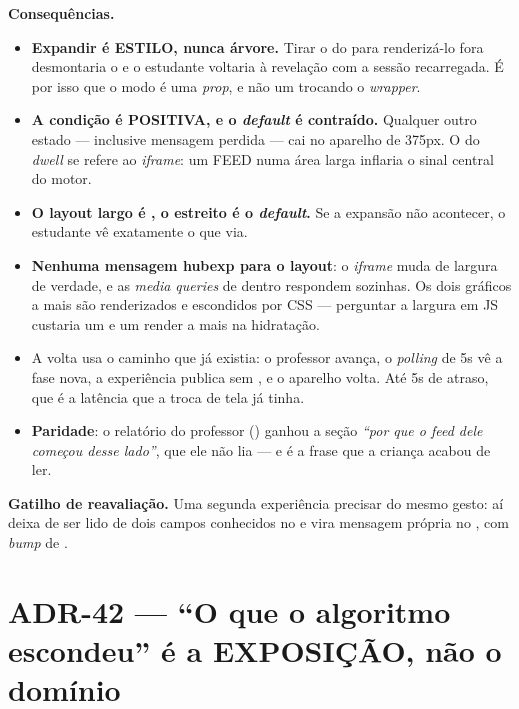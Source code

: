\textbf{Consequências.}
\begin{itemize}
  \item \textbf{Expandir é ESTILO, nunca árvore.} Tirar o  do
     para renderizá-lo fora desmontaria o  e
    o estudante voltaria à revelação com a sessão recarregada. É por isso que o
    modo é uma \emph{prop}, e não um  trocando o \emph{wrapper}.
  \item \textbf{A condição é POSITIVA, e o \emph{default} é contraído.}
    Qualquer outro estado --- inclusive mensagem perdida --- cai no aparelho de
    375px. O  do \emph{dwell} se refere ao
    \emph{iframe}: um FEED numa área larga inflaria o sinal central do motor.
  \item \textbf{O layout largo é , o estreito é o \emph{default}.} Se a
    expansão não acontecer, o estudante vê exatamente o que via.
  \item \textbf{Nenhuma mensagem hub\seta{}exp para o layout}: o
    \emph{iframe} muda de largura de verdade, e as \emph{media queries} de
    dentro respondem sozinhas. Os dois gráficos a mais são renderizados e
    escondidos por CSS --- perguntar a largura em JS custaria um
     e um render a mais na hidratação.
  \item A volta usa o caminho que já existia: o professor avança, o
    \emph{polling} de 5s vê a fase nova, a experiência publica
     sem , e o aparelho volta. Até 5s de
    atraso, que é a latência que a troca de tela já tinha.
  \item \textbf{Paridade}: o relatório do professor ()
    ganhou a seção \emph{``por que o feed dele começou desse lado''}, que ele
    não lia --- e é a frase que a criança acabou de ler.
\end{itemize}

\textbf{Gatilho de reavaliação.} Uma segunda experiência precisar do mesmo
gesto: aí  deixa de ser lido de dois campos conhecidos no
 e vira mensagem própria no , com \emph{bump}
de .


\section{ADR-42 --- ``O que o algoritmo escondeu'' é a EXPOSIÇÃO, não o domínio}
\label{adr:exposicao}

